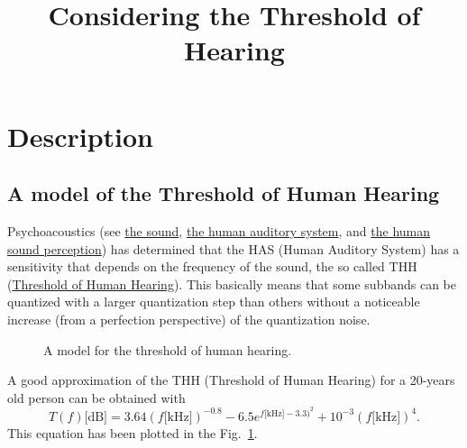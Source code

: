 
\title{Considering the Threshold of Hearing}

\maketitle

\section{Description}

\subsection{A model of the Threshold of Human Hearing}

Psychoacoustics (see
\href{https://vicente-gonzalez-ruiz.github.io/the_sound/}{the sound},
\href{https://vicente-gonzalez-ruiz.github.io/human_auditory_system/}{the
  human auditory system}, and
\href{https://vicente-gonzalez-ruiz.github.io/human_sound_perception/}{the
  human sound perception}) has determined that the HAS (Human Auditory
System) has a sensitivity that depends on the frequency of the sound,
the so called THH
(\href{https://en.wikipedia.org/wiki/Absolute_threshold_of_hearing}{Threshold
  of Human Hearing}). This basically means that some subbands can be
quantized with a larger quantization step than others without a
noticeable increase (from a perfection perspective) of the
quantization noise.

\begin{figure}
  \centering
  \caption{A model for the threshold of human hearing.}
  \label{fig:ToHH}
\end{figure}

A good approximation of the THH (Threshold of Human Hearing) for a 20-years old person can be
obtained with~\cite{bosi2003intro}
\begin{equation}
  T(f)\text{[dB]} = 3.64(f\text{[kHz]})^{-0.8} - 6.5e^{f\text{[kHz]}-3.3)^2} + 10^{-3}(f\text{[kHz]})^4.
  \label{eq:ToHH}
\end{equation}
This equation has been plotted in the Fig.~\ref{fig:ToHH}.

